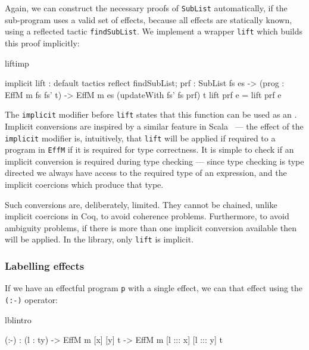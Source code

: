 Again, we can construct the necessary proofs of \texttt{SubList} automatically,
if the sub-program uses a valid set of effects, because all effects are
statically known, using a reflected tactic \texttt{findSubList}. We implement
a wrapper \texttt{lift} which builds this proof implicitly:

\begin{SaveVerbatim}{liftimp}

implicit
lift : {default tactics { 
                   reflect findSubList;  
                }
          prf : SubList fs es} ->
       (prog : EffM m fs fs' t) -> 
       EffM m es (updateWith fs' fs prf) t
lift {prf} e = lift prf e

\end{SaveVerbatim}

\noindent
The \texttt{implicit} modifier before \texttt{lift} states that this function
can be used as an . Implicit conversions are inspired
by a similar feature in Scala~\cite{Scala} --- the effect of the \texttt{implicit}
modifier is, intuitively, that \texttt{lift} will be applied if required to
a program in \texttt{EffM} if it is required for type correctness. It is
simple to check if an implicit conversion is required during type 
checking --- since type checking is type directed we always have access to the
required type of an expression, and the implicit coercions which produce
that type.

Such conversions are, deliberately, limited. They cannot be chained, unlike
implicit coercions in Coq, to avoid coherence problems. Furthermore, to avoid
ambiguity problems, if there is more than one implicit conversion available
then  will be applied. In the \Eff{} library, only \texttt{lift}
is implicit.

\subsubsection{Labelling effects}

If we have an effectful program \texttt{p} with a single effect, we can 
 that effect using the \texttt{(:-)} operator:

\begin{SaveVerbatim}{lblintro}

(:-)  : (l : ty) -> 
        EffM m [x] [y] t -> 
        EffM m [l ::: x] [l ::: y] t

\end{SaveVerbatim}


